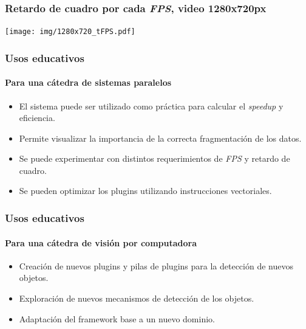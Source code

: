 \documentclass[11pt,a4paper,spanish]{beamer}
\begin{document}
\begin{frame}

\frametitle{Retardo de cuadro por cada \emph{FPS}, video 1280x720px}

\texttt{[image: img/1280x720\_tFPS.pdf]}

\end{frame}

\begin{frame}

\frametitle{Usos educativos}

\framesubtitle{Para una cátedra de sistemas paralelos}

\begin{itemize}

	\item El sistema puede ser utilizado como práctica para calcular el
		\emph{speedup} y eficiencia.
	
	\item Permite visualizar la importancia de la correcta fragmentación de
		los datos.

	\item Se puede experimentar con distintos requerimientos de \emph{FPS} y
		retardo de cuadro.

	\item Se pueden optimizar los plugins utilizando instrucciones
		vectoriales.

\end{itemize}

\end{frame}

\begin{frame}

\frametitle{Usos educativos}

\framesubtitle{Para una cátedra de visión por computadora}

\begin{itemize}

	\item Creación de nuevos plugins y pilas de plugins para la detección de
		nuevos objetos.

	\item Exploración de nuevos mecanismos de detección de los objetos.

	\item Adaptación del framework base a un nuevo dominio.

\end{itemize}

\end{frame}
\end{document}
